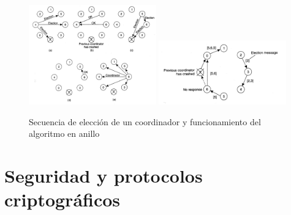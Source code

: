 \begin{figure}[H]
  \centering
  \includegraphics[width=0.49\textwidth]{Chapter2/Figures/bully}
  \includegraphics[width=0.49\textwidth]{Chapter2/Figures/ringalgorithm}
  \caption{Secuencia de elección de un coordinador y funcionamiento del algoritmo en anillo}
  \label{fig:tanenbaum:bully}
  \label{fig:tanenbaum:ringalgoritm}
\end{figure}



\section{Seguridad y protocolos criptográficos}

